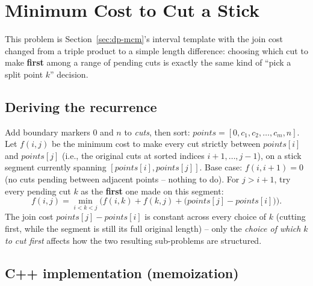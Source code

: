 \section{Minimum Cost to Cut a Stick}
\label{sec:dp-min-cost-cut-sticks}


\begin{patternbox}
This problem is Section~\ref{sec:dp-mcm}'s interval template with the
join cost changed from a triple product to a simple length difference:
choosing which cut to make \textbf{first} among a range of pending
cuts is exactly the same kind of ``pick a split point $k$'' decision.
\end{patternbox}

\subsection*{Deriving the recurrence}

Add boundary markers $0$ and $n$ to \textit{cuts}, then sort:
$\textit{points} = [0, c_1, c_2, \ldots, c_m, n]$. Let $f(i,j)$ be the
minimum cost to make every cut strictly between $\textit{points}[i]$
and $\textit{points}[j]$ (i.e., the original cuts at sorted indices
$i{+}1, \ldots, j{-}1$), on a stick segment currently spanning
$[\textit{points}[i], \textit{points}[j]]$. Base case:
$f(i, i{+}1) = 0$ (no cuts pending between adjacent points -- nothing
to do). For $j > i+1$, try every pending cut $k$ as the \textbf{first}
one made on this segment:
\[
  f(i,j) = \min_{i < k < j} \Big( f(i,k) + f(k,j) +
  \big(\textit{points}[j] - \textit{points}[i]\big) \Big).
\]
The join cost $\textit{points}[j]-\textit{points}[i]$ is constant
across every choice of $k$ (cutting first, while the segment is still
its full original length) -- only the \emph{choice of which $k$ to cut
first} affects how the two resulting sub-problems are structured.

\subsection*{C++ implementation (memoization)}

